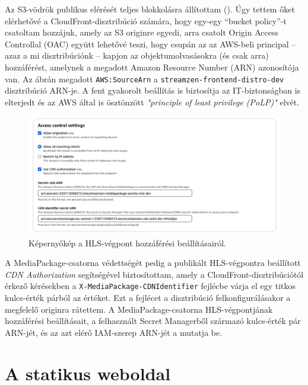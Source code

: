 Az S3-vödrök publikus elérését teljes blokkolásra állítottam (). Úgy tettem őket elérhetővé a CloudFront-disztribúció számára, hogy egy-egy ``bucket policy''-t csatoltam hozzájuk\cite{s3policy}, amely az S3 originre egyedi, arra csatolt Origin Access Controllal (OAC)\cite{oac} együtt lehetővé teszi, hogy csupán az az AWS-beli principal -- azaz a mi disztribúciónk -- kapjon az objektumolvasásokra (és csak arra) hozzáférést, amelynek a megadott Amazon Resource Number (ARN) azonosítója van. Az ábrán megadott \verb|AWS:SourceArn| a \verb|streamzen-frontend-distro-dev| disztribúció ARN-je. A fent gyakorolt beállítás is biztosítja az IT-biztonságban is elterjedt és az AWS által is ösztönzött \emph{"principle of least privilege (PoLP)"} elvét.

\begin{figure}[h]
  \centering
  \includegraphics[width=150mm, keepaspectratio]{figures/distro_mediapack.png}
  \caption{Képernyőkép a HLS-végpont hozzáférési beállításairól.}
  \label{fig:mediapack}
\end{figure}

A MediaPackage-csatorna védettségét pedig a publikált HLS-végpontra beállított \emph{CDN Authorization}\cite{cdnauth} segítségével biztosítottam, amely a CloudFront-disztribúciótól érkező kérésekben a \verb|X-MediaPackage-CDNIdentifier| fejlécbe várja el egy titkos kulcs-érték párból az értéket. Ezt a fejlécet a disztribúció felkonfigurálásakor a megfelelő originra rátettem. A MediaPackage-csatorna HLS-végpontjának hozzáférési beállításait, a felhasznált Secret Managerből származó kulcs-érték pár ARN-jét, és az azt elérő IAM-szerep ARN-jét a  mutatja be.

\section{A statikus weboldal}

